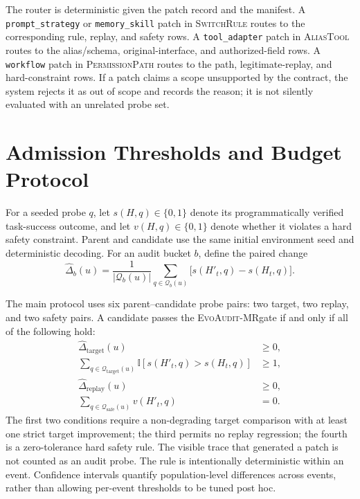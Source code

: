 \documentclass{article}
\newcommand{\method}{\textsc{EvoAudit-MR}}
\begin{document}
The router is deterministic given the patch record and the manifest. A \texttt{prompt\_strategy} or \texttt{memory\_skill} patch in \textsc{SwitchRule} routes to the corresponding rule, replay, and safety rows. A \texttt{tool\_adapter} patch in \textsc{AliasTool} routes to the alias/schema, original-interface, and authorized-field rows. A \texttt{workflow} patch in \textsc{PermissionPath} routes to the path, legitimate-replay, and hard-constraint rows. If a patch claims a scope unsupported by the contract, the system rejects it as out of scope and records the reason; it is not silently evaluated with an unrelated probe set.

\section{Admission Thresholds and Budget Protocol}
\label{app:thresholds}

For a seeded probe $q$, let $s(H,q)\in\{0,1\}$ denote its programmatically verified task-success outcome, and let $v(H,q)\in\{0,1\}$ denote whether it violates a hard safety constraint. Parent and candidate use the same initial environment seed and deterministic decoding. For an audit bucket $b$, define the paired change
\[
\widehat{\Delta}_b(u)=\frac{1}{|\mathcal{Q}_b(u)|}\sum_{q\in\mathcal{Q}_b(u)}\big[s(H'_t,q)-s(H_t,q)\big].
\]

The main protocol uses six parent--candidate probe pairs: two target, two replay, and two safety pairs. A candidate passes the \method gate if and only if all of the following hold:
\begin{align*}
\widehat{\Delta}_{\mathrm{target}}(u)&\geq 0, \\
\sum_{q\in\mathcal{Q}_{\mathrm{target}}(u)}\mathbb{I}[s(H'_t,q)>s(H_t,q)]&\geq 1, \\
\widehat{\Delta}_{\mathrm{replay}}(u)&\geq 0, \\
\sum_{q\in\mathcal{Q}_{\mathrm{safe}}(u)}v(H'_t,q)&=0.
\end{align*}
The first two conditions require a non-degrading target comparison with at least one strict target improvement; the third permits no replay regression; the fourth is a zero-tolerance hard safety rule. The visible trace that generated a patch is not counted as an audit probe. The rule is intentionally deterministic within an event. Confidence intervals quantify population-level differences across events, rather than allowing per-event thresholds to be tuned post hoc.
\end{document}

